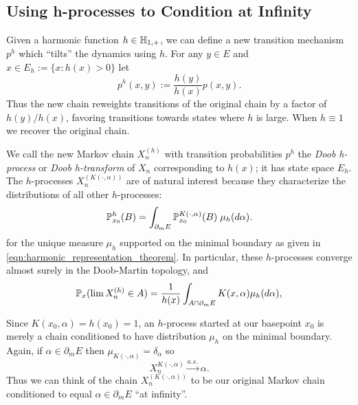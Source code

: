 \begin{subappendices}
\subsection{Using h-processes to Condition at Infinity} \label{sec:h_processes}

 Given a harmonic function $h \in \Hn$, we can define a new transition mechanism $p^h$
  which ``tilts'' the dynamics using $h$. For any $y \in E$ and $x \in E_h := \{x : h(x) > 0\}$ let
%
\begin{equation}
    p^h(x,y) := \frac{h(y)}{h(x)} p(x,y).
    \label{eqn:h-process}
\end{equation}
%
\noindent Thus the new chain reweights transitions of the original chain by a
factor of $h(y) / h(x)$, favoring transitions towards states where $h$ is large.
When $h \equiv 1$ we recover the original chain.

We call the new Markov chain $X^{(h)}_n$ with transition probabilities $p^h$ the
\textit{Doob h-process} or \textit{Doob h-transform} of $X_n$ corresponding to
$h(x)$; it has state space $E_h$. The $h$-processes $X_n^{(K(\cdot, \alpha))}$ are of natural interest
because they characterize the distributions of all other $h$-processes:
%
\begin{equation}
\P_{x_0}^h( B) = \int_{\partial_m E} \P_{x_0}^{K(\cdot, \alpha)}(B) \; \mu_h(d\alpha).
    \label{eqn:K_alpha_processes_char_h_processes}
\end{equation}%
%
\noindent for the unique measure $\mu_h$ supported on the minimal boundary as given in
\eqref{eqn:harmonic_representation_theorem}. In particular, these $h$-processes converge
almost surely in the Doob-Martin topology, and
%
\begin{equation}
    \P_{x}(\lim X_n^{(h)} \in A) = \frac{1}{h(x)} \int_{A \cap \partial_m E} K(x, \alpha) \mu_h(d\alpha),
    \label{eqn:limit_distribution_h-process}
\end{equation}

\noindent Since $K(x_0, \alpha) = h(x_0) = 1$, an $h$-process started at our basepoint $x_0$
is merely a chain conditioned to have distribution $\mu_h$ on the minimal boundary. Again, if $\alpha \in \partial_m E$
then $\mu_{K(\cdot, \alpha)} = \delta_\alpha$ so
%
    \[X_n^{K(\cdot, \alpha)} \xrightarrow{a.s.} \alpha.\]
%
Thus we can think of the chain $X^{(K(\cdot, \alpha))}_n$ to be our original Markov chain
conditioned to equal $\alpha \in \partial_m E$  ``at infinity''.



\end{subappendices}
